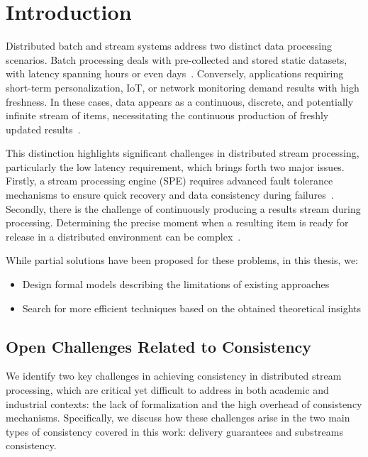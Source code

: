 \chapter{Introduction}

Distributed batch and stream systems address two distinct data processing scenarios. Batch processing deals with pre-collected and stored static datasets, with latency spanning hours or even days~\cite{carbone2015apache, chang2014hawq, sun2023survey}. Conversely, applications requiring short-term personalization, IoT, or network monitoring demand results with high freshness. In these cases, data appears as a continuous, discrete, and potentially infinite stream of items, necessitating the continuous production of freshly updated results~\cite{fragkoulis2024survey, diro2024anomaly}.

This distinction highlights significant challenges in distributed stream processing, particularly the low latency requirement, which brings forth two major issues. Firstly, a stream processing engine (SPE) requires advanced fault tolerance mechanisms to ensure quick recovery and data consistency during failures~\cite{Wang:2019:LSF:3341301.3359653, akidau2015streaming}. Secondly, there is the challenge of continuously producing a results stream during processing. Determining the precise moment when a resulting item is ready for release in a distributed environment can be complex~\cite{Tucker:2003:EPS:776752.776780, DBLP:journals/pvldb/BegoliACHKKMS21}.

While partial solutions have been proposed for these problems, in this thesis, we: 
\begin{itemize}
    \item Design formal models describing the limitations of existing approaches
    \item Search for more efficient techniques based on the obtained theoretical insights
\end{itemize}

\section{Open Challenges Related to Consistency}

We identify two key challenges in achieving consistency in distributed stream processing, which are critical yet difficult to address in both academic and industrial contexts: the lack of formalization and the high overhead of consistency mechanisms. Specifically, we discuss how these challenges arise in the two main types of consistency covered in this work: delivery guarantees and substreams consistency.

